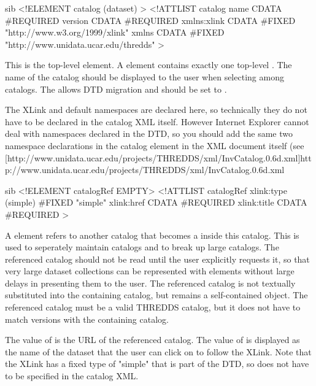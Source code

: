 \begin{vcode}{sib}
<!ELEMENT catalog (dataset) >
<!ATTLIST catalog
    name CDATA #REQUIRED
    version CDATA #REQUIRED
    xmlns:xlink CDATA #FIXED "http://www.w3.org/1999/xlink"
    xmlns CDATA #FIXED "http://www.unidata.ucar.edu/thredds"
>
\end{vcode}

This is the top-level element. A  element contains
exactly one top-level . The name of the catalog
should be displayed to the user when selecting among catalogs. The
 allows DTD migration and should be set to .

The XLink and default namespaces are declared here, so technically
they do not have to be declared in the catalog XML itself. However
Internet Explorer cannot deal with namespaces declared in the DTD, so
you should add the same two namespace declarations in the catalog
element in the XML document itself (see [http://www.unidata.ucar.edu/projects/THREDDS/xml/InvCatalog.0.6d.xml]{http://www.unidata.ucar.edu/projects/THREDDS/xml/InvCatalog.0.6d.xml}

 

\begin{vcode}{sib}
<!ELEMENT catalogRef EMPTY>
<!ATTLIST catalogRef
    xlink:type (simple) #FIXED "simple"
    xlink:href CDATA #REQUIRED
    xlink:title CDATA #REQUIRED
>
\end{vcode}

A  element refers to another catalog that becomes
a  inside this catalog. This is used to seperately
maintain catalogs and to break up large catalogs. The referenced
catalog should not be read until the user explicitly requests it, so
that very large dataset collections can be represented with
 elements without large delays in presenting them
to the user. The referenced catalog is not textually substituted into
the containing catalog, but remains a self-contained object.  The
referenced catalog must be a valid THREDDS catalog, but it does not
have to match versions with the containing catalog.

The value of  is the URL of the referenced catalog.
The value of  is displayed as the name of the dataset
that the user can click on to follow the XLink. Note that the XLink
has a fixed type of "simple" that is part of the DTD, so does not have
to be specified in the catalog XML.

